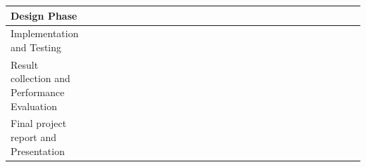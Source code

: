 \documentclass[titlepage]{report}
\begin{document}
\begin{table}[ht]
\begin{adjustbox}{width=1.3\textwidth}
\begin{tabular}{|l|l|l|l|l|l|l|l|l|l|l|l|l|l|l|l|l|l|l|l|l|l|l|l|l|l|l|l|l|}
Design Phase                                 &  &  &                          &                          &                          & \cellcolor[HTML]{32CB00} & \cellcolor[HTML]{32CB00} &                          &                          &                          &                          &                          &                          &                          &                          &                          &                          &                          &                          &                          &                          &                          &                          &                          &                          &                          &  &  \\ \hline
Implementation and Testing                   &  &  &                          &                          &                          & \cellcolor[HTML]{32CB00}                         & \cellcolor[HTML]{32CB00} & \cellcolor[HTML]{32CB00} & \cellcolor[HTML]{32CB00} & \cellcolor[HTML]{32CB00} & \cellcolor[HTML]{32CB00} & \cellcolor[HTML]{32CB00} & \cellcolor[HTML]{32CB00} & \cellcolor[HTML]{32CB00} & \cellcolor[HTML]{32CB00} & \cellcolor[HTML]{32CB00} & \cellcolor[HTML]{32CB00} &                          &                          &                          &                          &                          &                          &                          &                          &                          &  &  \\ \hline
Result collection and Performance Evaluation &  &  &                          &                          &                          &                          &                          &                          &                          &                          &                          &                          &                          &                          &                          &                          & \cellcolor[HTML]{32CB00} & \cellcolor[HTML]{32CB00} & \cellcolor[HTML]{32CB00} & \cellcolor[HTML]{32CB00} & \cellcolor[HTML]{32CB00} & \cellcolor[HTML]{32CB00} &                          &                          &                          &                          &  &  \\ \hline
Final project report and Presentation        &  &  &                          &                          &                          &                          &                          &                          &                          &                          &                          &                          &                          &                          &                          &                          &                          &                          &                          &                          &                          & \cellcolor[HTML]{32CB00} & \cellcolor[HTML]{32CB00} & \cellcolor[HTML]{32CB00} & \cellcolor[HTML]{32CB00} & \cellcolor[HTML]{32CB00} &  &  \\ \hline
\end{tabular}
\end{adjustbox}
\end{table}
\end{document}
